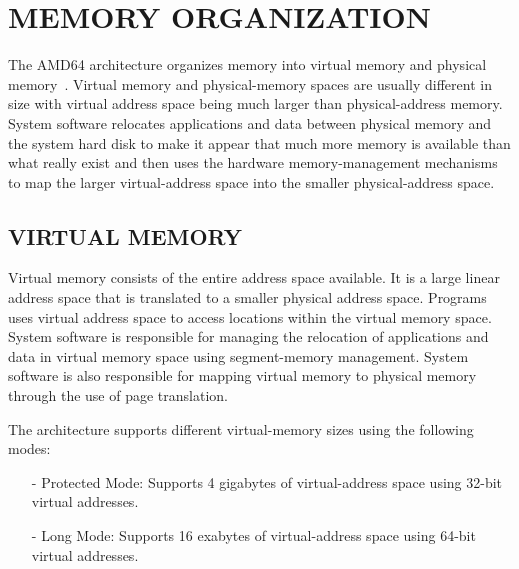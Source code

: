 \section{MEMORY ORGANIZATION}

The AMD64 architecture organizes memory into virtual memory and physical memory~\citep{SS:AMD64-V2}. Virtual memory and physical-memory spaces are usually different in size with virtual address space being much larger than physical-address memory.  System software relocates applications and data between physical memory and the system hard disk to make it appear that much more memory is available than what really exist and then uses the hardware memory-management mechanisms to map the larger virtual-address space into the smaller physical-address space.

\subsection {VIRTUAL MEMORY}
Virtual memory consists of the entire address space available. It is a large linear address space that is translated to a smaller physical address space. Programs uses virtual address space to access locations within the virtual memory space. System software is responsible for managing the relocation of applications and data in virtual memory space using segment-memory management. System software is also responsible for mapping virtual memory to physical memory through the use of page translation.

The architecture supports different virtual-memory sizes using the following modes:
\begin{itemize}

\item[-] Protected Mode: Supports 4 gigabytes of virtual-address space using 32-bit virtual  addresses.

\item[-] Long Mode: Supports 16 exabytes of virtual-address space using 64-bit virtual addresses.
\end{itemize}

